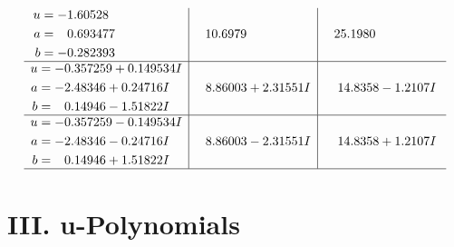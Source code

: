 \documentclass[1p]{elsarticle_modified}
\theoremstyle{definition}
\begin{document}
$$\begin{array}{c|c|c}
\begin{aligned}
u &= -1.60528\phantom{ +0.000000I} \\
a &= \phantom{-}0.693477\phantom{ +0.000000I} \\
b &= -0.282393\phantom{ +0.000000I}\end{aligned}
 & \phantom{-}10.6979\phantom{ +0.000000I} & \phantom{-}25.1980\phantom{ +0.000000I} \\ \hline\begin{aligned}
u &= -0.357259 + 0.149534 I \\
a &= -2.48346 + 0.24716 I \\
b &= \phantom{-}0.14946 - 1.51822 I\end{aligned}
 & \phantom{-}8.86003 + 2.31551 I & \phantom{-}14.8358 - 1.2107 I \\ \hline\begin{aligned}
u &= -0.357259 - 0.149534 I \\
a &= -2.48346 - 0.24716 I \\
b &= \phantom{-}0.14946 + 1.51822 I\end{aligned}
 & \phantom{-}8.86003 - 2.31551 I & \phantom{-}14.8358 + 1.2107 I\\
 \hline 
 \end{array}$$\newpage
\newpage\renewcommand{\arraystretch}{1}
\centering \section*{ III. u-Polynomials}
\end{document}
